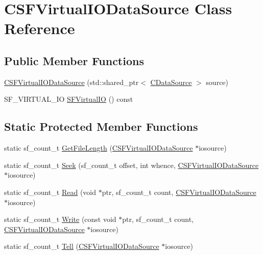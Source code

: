 \hypertarget{classCSFVirtualIODataSource}{}\section{C\+S\+F\+Virtual\+I\+O\+Data\+Source Class Reference}
\label{classCSFVirtualIODataSource}
\subsection*{Public Member Functions}
\begin{DoxyCompactItemize}
\item 
\hyperlink{classCSFVirtualIODataSource_acd8bf4483224c3101dafc14df967bc24}{C\+S\+F\+Virtual\+I\+O\+Data\+Source} (std\+::shared\+\_\+ptr$<$ \hyperlink{classCDataSource}{C\+Data\+Source} $>$ source)
\item 
S\+F\+\_\+\+V\+I\+R\+T\+U\+A\+L\+\_\+\+IO \hyperlink{classCSFVirtualIODataSource_a9c15fbbe734fdfc2af17ca8f424b7e43}{S\+F\+Virtual\+IO} () const
\end{DoxyCompactItemize}
\subsection*{Static Protected Member Functions}
\begin{DoxyCompactItemize}
\item 
static sf\+\_\+count\+\_\+t \hyperlink{classCSFVirtualIODataSource_a94ee0d9f4703661ca7f2cad8cf294690}{Get\+File\+Length} (\hyperlink{classCSFVirtualIODataSource}{C\+S\+F\+Virtual\+I\+O\+Data\+Source} $\ast$iosource)
\item 
static sf\+\_\+count\+\_\+t \hyperlink{classCSFVirtualIODataSource_a04735e135ffc05dd53fce944e772fcfc}{Seek} (sf\+\_\+count\+\_\+t offset, int whence, \hyperlink{classCSFVirtualIODataSource}{C\+S\+F\+Virtual\+I\+O\+Data\+Source} $\ast$iosource)
\item 
static sf\+\_\+count\+\_\+t \hyperlink{classCSFVirtualIODataSource_a40021962590f0911d8af1020397fbba1}{Read} (void $\ast$ptr, sf\+\_\+count\+\_\+t count, \hyperlink{classCSFVirtualIODataSource}{C\+S\+F\+Virtual\+I\+O\+Data\+Source} $\ast$iosource)
\item 
static sf\+\_\+count\+\_\+t \hyperlink{classCSFVirtualIODataSource_ac1d38c4c9d8ba3e0a2affd7dd72283ee}{Write} (const void $\ast$ptr, sf\+\_\+count\+\_\+t count, \hyperlink{classCSFVirtualIODataSource}{C\+S\+F\+Virtual\+I\+O\+Data\+Source} $\ast$iosource)
\item 
static sf\+\_\+count\+\_\+t \hyperlink{classCSFVirtualIODataSource_aae8e2b59f9753ed1f8baca1561b15962}{Tell} (\hyperlink{classCSFVirtualIODataSource}{C\+S\+F\+Virtual\+I\+O\+Data\+Source} $\ast$iosource)
\end{DoxyCompactItemize}
